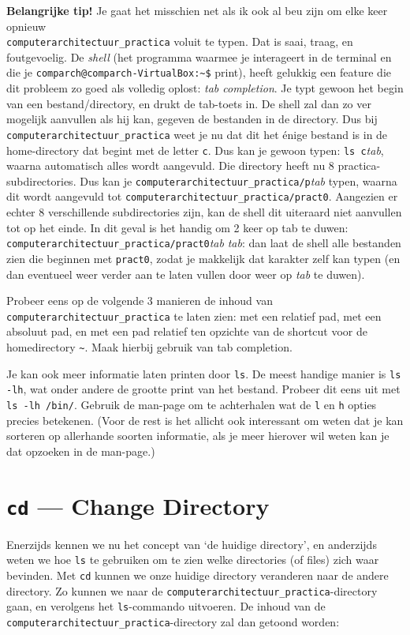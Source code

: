 \documentclass[a4paper,twoside,openany]{memoir}
\begin{document}
\textbf{Belangrijke tip!} Je gaat het misschien net als ik ook al beu zijn om
elke keer opnieuw\\
\verb!computerarchitectuur_practica! voluit te typen. Dat is
saai, traag, en foutgevoelig. De \emph{shell} (het programma waarmee je
interageert in de terminal en die je \verb!comparch@comparch-VirtualBox:~$!
print), heeft gelukkig een feature die dit probleem zo goed als volledig oplost:
\emph{tab completion}. Je typt gewoon het begin van een bestand/directory, en
drukt de tab-toets in. De shell zal dan zo ver mogelijk aanvullen als hij kan,
gegeven de bestanden in de directory. Dus bij
\verb!computerarchitectuur_practica! weet je nu dat dit het \'enige bestand is
in de home-directory dat begint met de letter \verb!c!. Dus kan je gewoon typen:
\verb!ls c!\emph{tab}, waarna automatisch alles wordt aangevuld. Die directory
heeft nu 8 practica-subdirectories. Dus kan je
\verb!computerarchitectuur_practica/p!\emph{tab} typen, waarna dit wordt
aangevuld tot \verb!computerarchitectuur_practica/pract0!. Aangezien er echter 8
verschillende subdirectories zijn, kan de shell dit uiteraard niet aanvullen tot
op het einde. In dit geval is het handig om 2 keer op tab te duwen:
\verb!computerarchitectuur_practica/pract0!\emph{tab} \emph{tab}: dan laat de
shell alle bestanden zien die beginnen met \verb!pract0!, zodat je makkelijk dat
karakter zelf kan typen (en dan eventueel weer verder aan te laten vullen door
weer op \emph{tab} te duwen).

Probeer eens op de volgende 3 manieren de inhoud van
\verb!computerarchitectuur_practica! te laten zien: met een relatief pad, met
een absoluut pad, en met een pad relatief ten opzichte van de shortcut voor de
homedirectory \verb!~!. Maak hierbij gebruik van tab completion.

Je kan ook meer informatie laten printen door \verb!ls!. De meest handige manier
is \verb!ls -lh!, wat onder andere de grootte print van het bestand. Probeer dit
eens uit met \verb!ls -lh /bin/!. Gebruik de man-page om te achterhalen wat de
\verb!l! en \verb!h! opties precies betekenen. (Voor de rest is het allicht ook
interessant om weten dat je kan sorteren op allerhande soorten informatie, als
je meer hierover wil weten kan je dat opzoeken in de man-page.)

\section{\texttt{cd} --- Change Directory}

Enerzijds kennen we nu het concept van `de huidige directory', en anderzijds
weten we hoe \verb!ls! te gebruiken om te zien welke directories (of files) zich
waar bevinden. Met \verb!cd! kunnen we onze huidige directory veranderen naar de
andere directory. Zo kunnen we naar de
\verb!computerarchitectuur_practica!-directory gaan, en verolgens het
\verb!ls!-commando uitvoeren. De inhoud van de
\verb!computerarchitectuur_practica!-directory zal dan getoond worden:
\end{document}
